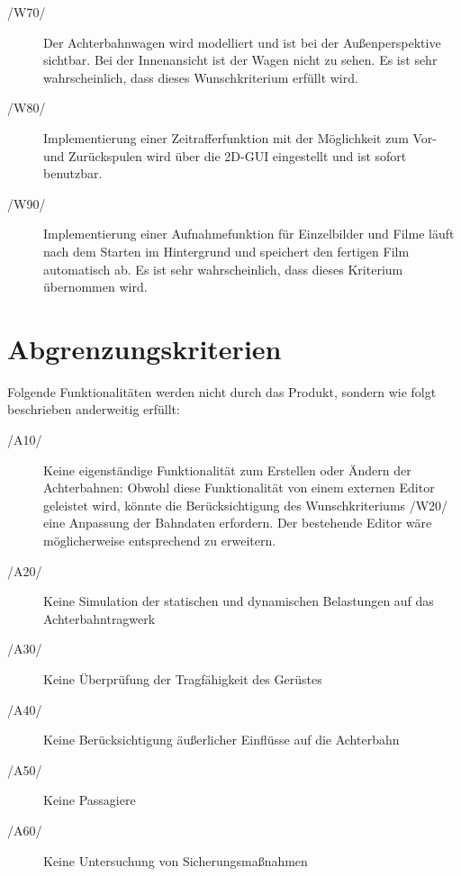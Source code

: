 \begin{description}
	\item[/W70/] Der Achterbahnwagen wird modelliert und ist bei der Außenperspektive sichtbar. Bei der Innenansicht ist der Wagen nicht zu sehen. Es ist sehr wahrscheinlich, dass dieses Wunschkriterium erfüllt wird.
	\item[/W80/] Implementierung einer Zeitrafferfunktion mit der Möglichkeit zum Vor- und Zurückspulen wird über die 2D-GUI eingestellt und ist sofort benutzbar.
	\item[/W90/] Implementierung einer Aufnahmefunktion für Einzelbilder und Filme läuft nach dem Starten im Hintergrund und speichert den fertigen Film automatisch ab. Es ist sehr wahrscheinlich, dass dieses Kriterium übernommen wird.
\end{description}

\section{Abgrenzungskriterien}
Folgende Funktionalitäten werden nicht durch das Produkt, sondern wie folgt
beschrieben anderweitig erfüllt:
\begin{description}
	\item[/A10/] Keine eigenständige Funktionalität zum Erstellen oder Ändern der Achterbahnen: Obwohl diese Funktionalität von einem externen Editor geleistet wird, könnte die Berücksichtigung
		     des Wunschkriteriums /W20/ eine Anpassung der Bahndaten erfordern. Der bestehende Editor wäre möglicherweise entsprechend zu erweitern.
	\item[/A20/] Keine Simulation der statischen und dynamischen Belastungen auf das Achterbahntragwerk
	\item[/A30/] Keine Überprüfung der Tragfähigkeit des Gerüstes
	\item[/A40/] Keine Berücksichtigung äußerlicher Einflüsse auf die Achterbahn
	\item[/A50/] Keine Passagiere
	\item[/A60/] Keine Untersuchung von Sicherungsmaßnahmen
\end{description}
